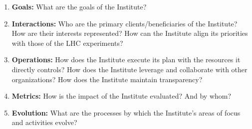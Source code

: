 \begin{enumerate}
\item {\bf Goals:} What are the goals of the Institute?
\item {\bf Interactions:} Who are the primary clients/beneficiaries of the Institute? How are their interests represented? How can the Institute align its priorities with those of the LHC experiments? 
\item {\bf Operations:} How does the Institute execute its plan with the resources it directly controls? How does the Institute leverage and collaborate with other organizations? How does the Institute maintain transparency?
\item {\bf Metrics:} How is the impact of the Institute evaluated? And by whom?
\item {\bf Evolution:} What are the processes by which the Institute’s areas of focus and activities evolve? 
\end{enumerate}


